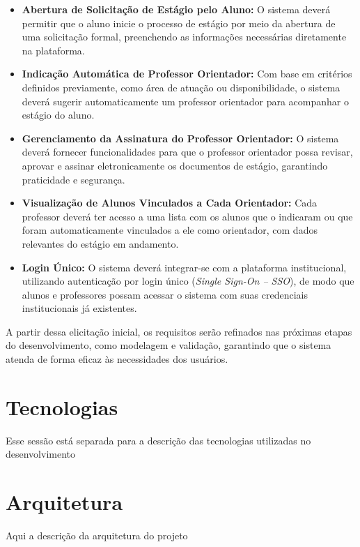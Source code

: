 \begin{itemize}
    \item \textbf{Abertura de Solicitação de Estágio pelo Aluno:} O sistema deverá permitir que o aluno inicie o processo de estágio por meio da abertura de uma solicitação formal, preenchendo as informações necessárias diretamente na plataforma.
    
    \item \textbf{Indicação Automática de Professor Orientador:} Com base em critérios definidos previamente, como área de atuação ou disponibilidade, o sistema deverá sugerir automaticamente um professor orientador para acompanhar o estágio do aluno.
    
    \item \textbf{Gerenciamento da Assinatura do Professor Orientador:} O sistema deverá fornecer funcionalidades para que o professor orientador possa revisar, aprovar e assinar eletronicamente os documentos de estágio, garantindo praticidade e segurança.
    
    \item \textbf{Visualização de Alunos Vinculados a Cada Orientador:} Cada professor deverá ter acesso a uma lista com os alunos que o indicaram ou que foram automaticamente vinculados a ele como orientador, com dados relevantes do estágio em andamento.
    
    \item \textbf{Login Único:} O sistema deverá integrar-se com a plataforma institucional, utilizando autenticação por login único (\textit{Single Sign-On – SSO}), de modo que alunos e professores possam acessar o sistema com suas credenciais institucionais já existentes.
\end{itemize}

A partir dessa elicitação inicial, os requisitos serão refinados nas próximas etapas do desenvolvimento, como modelagem e validação, garantindo que o sistema atenda de forma eficaz às necessidades dos usuários.


\section*{Tecnologias}
Esse sessão está separada para a descrição das tecnologias utilizadas no desenvolvimento


\section*{Arquitetura}
Aqui a descrição da arquitetura do projeto

